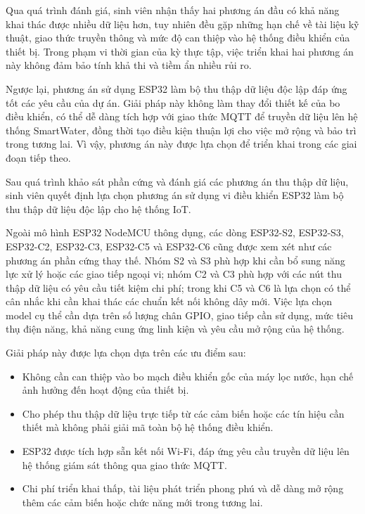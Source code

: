 Qua quá trình đánh giá, sinh viên nhận thấy hai phương án đầu có khả năng khai thác được nhiều dữ liệu hơn, tuy nhiên đều gặp những hạn chế về tài liệu kỹ thuật, giao thức truyền thông và mức độ can thiệp vào hệ thống điều khiển của thiết bị. Trong phạm vi thời gian của kỳ thực tập, việc triển khai hai phương án này không đảm bảo tính khả thi và tiềm ẩn nhiều rủi ro.

Ngược lại, phương án sử dụng ESP32 làm bộ thu thập dữ liệu độc lập đáp ứng tốt các yêu cầu của dự án. Giải pháp này không làm thay đổi thiết kế của bo điều khiển, có thể dễ dàng tích hợp với giao thức MQTT để truyền dữ liệu lên hệ thống SmartWater, đồng thời tạo điều kiện thuận lợi cho việc mở rộng và bảo trì trong tương lai. Vì vậy, phương án này được lựa chọn để triển khai trong các giai đoạn tiếp theo.

Sau quá trình khảo sát phần cứng và đánh giá các phương án thu thập dữ liệu, sinh viên quyết định lựa chọn phương án sử dụng vi điều khiển ESP32 làm bộ thu thập dữ liệu độc lập cho hệ thống IoT.

Ngoài mô hình ESP32 NodeMCU thông dụng, các dòng ESP32-S2, ESP32-S3, ESP32-C2, ESP32-C3, ESP32-C5 và ESP32-C6 cũng được xem xét như các phương án phần cứng thay thế. Nhóm S2 và S3 phù hợp khi cần bổ sung năng lực xử lý hoặc các giao tiếp ngoại vi; nhóm C2 và C3 phù hợp với các nút thu thập dữ liệu có yêu cầu tiết kiệm chi phí; trong khi C5 và C6 là lựa chọn có thể cân nhắc khi cần khai thác các chuẩn kết nối không dây mới. Việc lựa chọn model cụ thể cần dựa trên số lượng chân GPIO, giao tiếp cần sử dụng, mức tiêu thụ điện năng, khả năng cung ứng linh kiện và yêu cầu mở rộng của hệ thống.

Giải pháp này được lựa chọn dựa trên các ưu điểm sau:

\begin{itemize}
    \item Không cần can thiệp vào bo mạch điều khiển gốc của máy lọc nước, hạn chế ảnh hưởng đến hoạt động của thiết bị.
    
    \item Cho phép thu thập dữ liệu trực tiếp từ các cảm biến hoặc các tín hiệu cần thiết mà không phải giải mã toàn bộ hệ thống điều khiển.
    
    \item ESP32 được tích hợp sẵn kết nối Wi-Fi, đáp ứng yêu cầu truyền dữ liệu lên hệ thống giám sát thông qua giao thức MQTT.
    
    \item Chi phí triển khai thấp, tài liệu phát triển phong phú và dễ dàng mở rộng thêm các cảm biến hoặc chức năng mới trong tương lai.
\end{itemize}

